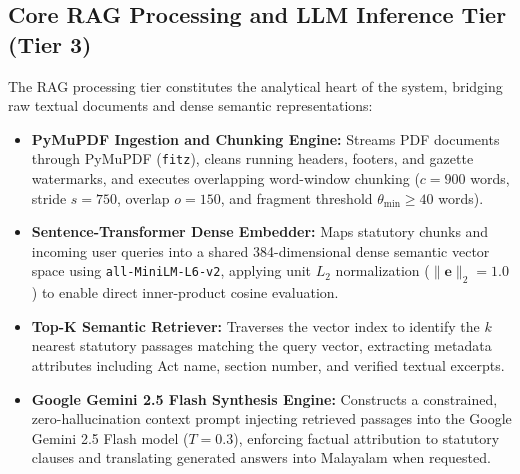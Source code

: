 \documentclass[12pt,a4paper]{report}
\begin{document}
\subsection{Core RAG Processing and LLM Inference Tier (Tier 3)}
The RAG processing tier constitutes the analytical heart of the system, bridging raw textual documents and dense semantic representations:
\begin{itemize}
    \item \textbf{PyMuPDF Ingestion and Chunking Engine:} Streams PDF documents through PyMuPDF (\texttt{fitz}), cleans running headers, footers, and gazette watermarks, and executes overlapping word-window chunking ($c = 900$ words, stride $s = 750$, overlap $o = 150$, and fragment threshold $\theta_{\min} \ge 40$ words).
    \item \textbf{Sentence-Transformer Dense Embedder:} Maps statutory chunks and incoming user queries into a shared 384-dimensional dense semantic vector space using \texttt{all-MiniLM-L6-v2}, applying unit $L_2$ normalization ($\|\mathbf{e}\|_2 = 1.0$) to enable direct inner-product cosine evaluation.
    \item \textbf{Top-K Semantic Retriever:} Traverses the vector index to identify the $k$ nearest statutory passages matching the query vector, extracting metadata attributes including Act name, section number, and verified textual excerpts.
    \item \textbf{Google Gemini 2.5 Flash Synthesis Engine:} Constructs a constrained, zero-hallucination context prompt injecting retrieved passages into the Google Gemini 2.5 Flash model ($T = 0.3$), enforcing factual attribution to statutory clauses and translating generated answers into Malayalam when requested.
\end{itemize}
\end{document}
